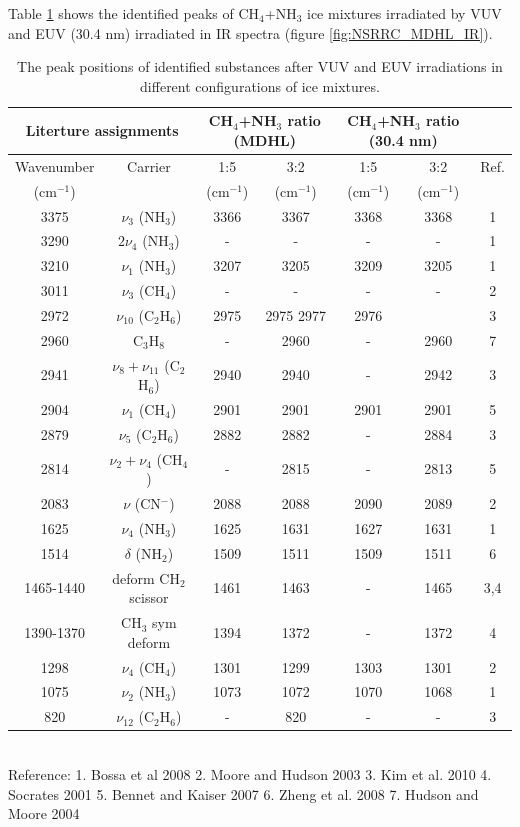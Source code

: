 Table \ref{tab:WavenumberNSRRC} shows the identified peaks of CH$_4$+NH$_3$ ice mixtures irradiated by VUV and EUV (30.4 nm) irradiated in IR spectra (figure \ref{fig:NSRRC_MDHL_IR}).

\begin{table}[htbp]
\caption{The peak positions of identified substances after VUV and EUV irradiations in different configurations of ice mixtures.}
\label{tab:WavenumberNSRRC}
\begin{tabular}{ccccccc}
\hline
\hline
\multicolumn{2}{c}{Literture assignments} & \multicolumn{2}{c}{CH$_4$+NH$_3$ ratio (MDHL)} & \multicolumn{2}{c}{CH$_4$+NH$_3$ ratio (30.4 nm)} \\
\hline
Wavenumber & Carrier  & 1:5 & 3:2 & 1:5 & 3:2 & Ref. \\
(cm$^{-1}$) &   & (cm$^{-1}$) & (cm$^{-1}$) & (cm$^{-1}$) & (cm$^{-1}$) &\\
\hline
3375 & $\nu_3$ (NH$_3$) & 3366 & 3367 & 3368 & 3368 & 1 \\
3290 & $2\nu_4$ (NH$_3$) & - & - & - & - & 1 \\
3210 & $\nu_1$ (NH$_3$) & 3207 & 3205 & 3209 & 3205 &1 \\
3011 & $\nu_3$ (CH$_4$) & - & - & - & - & 2 \\
2972 & $\nu_{10}$ (C$_2$H$_6$) & 2975 & 2975 2977 & 2976 & & 3 \\
2960 & C$_3$H$_8$ & - & 2960 & - & 2960 & 7 \\
2941 & $\nu_8+\nu_11$ (C$_2$H$_6$) & 2940 & 2940 & - & 2942 & 3 \\
2904 & $\nu_1$ (CH$_4$) & 2901 & 2901 & 2901 & 2901 & 5 \\
2879 & $\nu_5$ (C$_2$H$_6$) & 2882 & 2882 & - & 2884&  3 \\
2814 & $\nu_2+\nu_4$ (CH$_4$) & - & 2815 & - & 2813 & 5 \\
2083 & $\nu$ (CN$^-$) & 2088  & 2088 & 2090 & 2089 & 2 \\
1625 & $\nu_4$ (NH$_3$) & 1625 & 1631 & 1627 & 1631 & 1 \\
1514 & $\delta$ (NH$_2$) & 1509 & 1511 & 1509 & 1511 & 6 \\
1465-1440 & deform CH$_2$ scissor & 1461 & 1463 & - & 1465 & 3,4 \\
1390-1370 & CH$_3$ sym deform & 1394 & 1372 & - & 1372 & 4 \\
1298 & $\nu_4$ (CH$_4$) & 1301 & 1299 & 1303 & 1301 & 2 \\
1075 & $\nu_2$ (NH$_3$) & 1073 & 1072 & 1070 & 1068 & 1 \\
820 & $\nu_12$ (C$_2$H$_6$) & - & 820 & - & - & 3 \\
\hline
\end{tabular}\\
Reference: 1. Bossa et al 2008 2. Moore and Hudson 2003 3. Kim et al. 2010 4. Socrates 2001 5. Bennet and Kaiser 2007 6. Zheng et al. 2008 7. Hudson and Moore 2004
\end{table}


